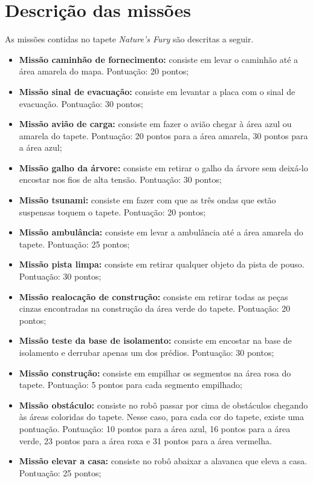 \section{Descrição das missões}
As missões contidas no tapete \textit{Nature's Fury} são descritas a seguir.
\begin{itemize}
\item \textbf{Missão caminhão de fornecimento:} consiste em levar o caminhão até a área amarela do mapa. Pontuação: 20 pontos;
\item \textbf{Missão sinal de evacuação:} consiste em levantar a placa com o sinal de evacuação. Pontuação: 30 pontos;
\item \textbf{Missão avião de carga:} consiste em fazer o avião chegar à área azul ou amarela do tapete. Pontuação: 20 pontos para a área amarela, 30 pontos para a área azul;
\item \textbf{Missão galho da árvore:} consiste em retirar o galho da árvore sem deixá-lo encostar nos fios de alta tensão. Pontuação: 30 pontos;
\item \textbf{Missão tsunami:} consiste em fazer com que as três ondas que estão suspensas toquem o tapete. Pontuação: 20 pontos;
\item \textbf{Missão ambulância:} consiste em levar a ambulância até a área amarela do tapete. Pontuação: 25 pontos;
\item \textbf{Missão pista limpa:} consiste em retirar qualquer objeto da pista de pouso. Pontuação: 30 pontos;
\item \textbf{Missão realocação de construção:} consiste em retirar todas as peças cinzas encontradas na construção da área verde do tapete. Pontuação: 20 pontos;
\item \textbf{Missão teste da base de isolamento:} consiste em encostar na base de isolamento e derrubar apenas um dos prédios. Pontuação: 30 pontos;
\item \textbf{Missão construção:} consiste em empilhar os segmentos na área rosa do tapete. Pontuação: 5 pontos para cada segmento empilhado;
\item \textbf{Missão obstáculo:} consiste no robô passar por cima de obstáculos chegando às áreas coloridas do tapete. Nesse caso, para cada cor do tapete, existe uma pontuação. Pontuação: 10 pontos para a área azul, 16 pontos para a área verde, 23 pontos para a área roxa e 31 pontos para a área vermelha.
\item \textbf{Missão elevar a casa:} consiste no robô abaixar a alavanca que eleva a casa. Pontuação: 25 pontos;

\end{itemize}
